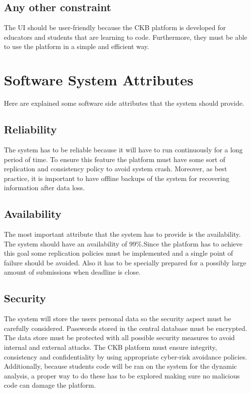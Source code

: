 \begin{enumerate}[label=\textbf{[UC\arabic*]}]
    


\subsection{Any other constraint}
The UI should be user-friendly because the CKB platform is developed for educators and students that are learning to code. Furthermore, they must be able to use the platform in a simple and efficient way.

\section{Software System Attributes}
Here are explained some  software side attributes that the system should provide.
\subsection{Reliability}
The system has to be reliable because it will have to run continuously for a long period of time.
To ensure this feature the platform must have some sort of replication and consistency policy to avoid system crash. Moreover, as best practice, it is important to have offline backups of the system for recovering information after data loss.
\subsection{Availability}
The most important attribute that the system has to provide is the availability. The system should have an availability of 99\%.Since the platform has to achieve this goal some replication policies must be implemented and a single point of failure should be avoided. Also it has to be specially prepared for a possibly large amount of submissions when deadline is close.
\subsection{Security}
The system will store the users personal data so the security aspect must be carefully considered. Passwords stored in the central database must be encrypted.
The data store must be protected with all possible security measures to avoid internal and external attacks. The CKB platform must ensure integrity, consistency and confidentiality by using appropriate cyber-risk avoidance policies.
Additionally, because students code will be ran on the system for the dynamic analysis, a proper way to do these has to be explored making sure no malicious code can  damage the platform.

\end{enumerate}
